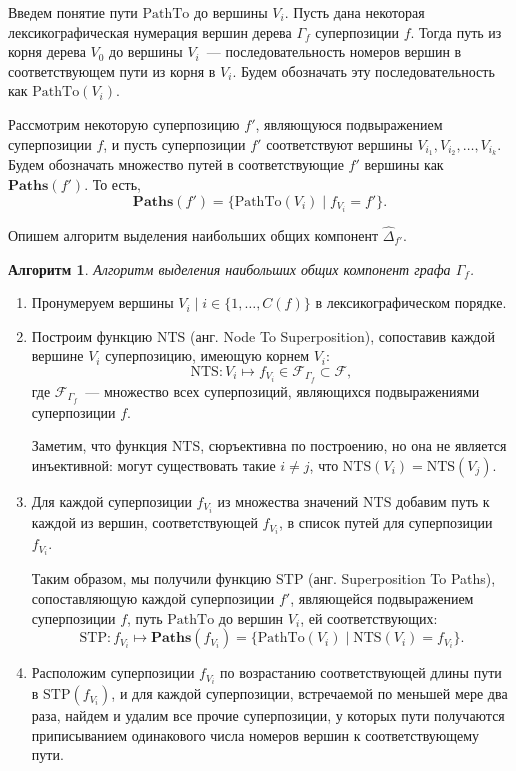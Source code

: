 \documentclass[12pt,a4paper]{article}
\newtheorem{algo}{Алгоритм}
\begin{document}
Введем понятие пути $\text{PathTo}$ до вершины $V_i$. Пусть дана некоторая
лексикографическая нумерация вершин дерева $\Gamma_f$ суперпозиции $f$. Тогда
путь из корня дерева $V_0$ до вершины $V_i$~--- последовательность номеров
вершин в соответствующем пути из корня в $V_i$. Будем обозначать эту
последовательность как $\text{PathTo} (V_i)$.

Рассмотрим некоторую суперпозицию $f'$, являющуюся подвыражением суперпозиции
$f$, и пусть суперпозиции $f'$ соответствуют вершины
$V_{i_1}, V_{i_2}, \dots, V_{i_k}$. Будем обозначать множество путей в
соответствующие $f'$ вершины как $\mathbf{Paths}(f')$. То есть,
\[
\mathbf{Paths}(f') = \{ \text{PathTo} (V_i) \mid f_{V_i} = f' \}.
\]

Опишем алгоритм выделения наибольших общих компонент $\hat{\Delta}_{f'}$.
\begin{algo}
  \label{algo:BCCIsolator}
  Алгоритм выделения наибольших общих компонент графа $\Gamma_f$.
\end{algo}
\begin{enumerate}
  \item Пронумеруем вершины $V_i \mid i \in \{1, \dots, C(f)\}$ в
	лексикографическом порядке.
  \item Построим функцию $\text{NTS}$ (анг. Node To Superposition), сопоставив каждой
	вершине $V_i$ суперпозицию, имеющую корнем $V_i$:
	\[
	\text{NTS} : V_i \mapsto f_{V_i} \in \mathcal{F}_{\Gamma_f} \subset \mathcal{F},
	\]
	где $\mathcal{F}_{\Gamma_f}$~--- множество всех суперпозиций, являющихся
	подвыражениями суперпозиции $f$.

	Заметим, что функция $\text{NTS}$, сюръективна по построению, но она не является инъективной:
	могут существовать такие $i \neq j$, что $\text{NTS} (V_i) = \text{NTS} (V_j)$.
  \item Для каждой суперпозиции $f_{V_i}$ из множества значений $\text{NTS}$ добавим
	путь к каждой из вершин, соответствующей $f_{V_i}$, в список путей для
	суперпозиции $f_{V_i}$.

	Таким образом, мы получили функцию $\text{STP}$ (анг. Superposition To
	Paths), сопоставляющую каждой суперпозиции $f'$, являющейся подвыражением
	суперпозиции $f$, путь $\text{PathTo}$ до вершин $V_i$, ей соответствующих:
	\[
	\text{STP} : f_{V_i} \mapsto \mathbf{Paths}(f_{V_i}) = \{ \text{PathTo}(V_i) \mid \text{NTS} (V_i) = f_{V_i} \}.
	\]
  \item Расположим суперпозиции $f_{V_i}$ по возрастанию соответствующей длины
	пути в $\text{STP}(f_{V_i})$, и для каждой суперпозиции, встречаемой по меньшей мере два
	раза, найдем и удалим все прочие суперпозиции, у которых пути получаются
	приписыванием одинакового числа номеров вершин к соответствующему пути.
\end{enumerate}
\end{document}
